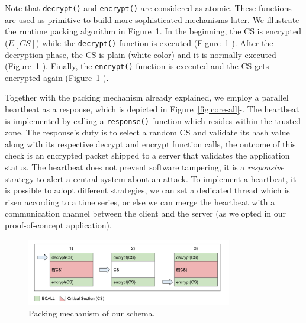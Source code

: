 Note that \texttt{decrypt()} and \texttt{encrypt()} are considered as atomic. 
These functions are used as primitive to build more sophisticated mechanisms 
later.
We illustrate the runtime packing algorithm in Figure~\ref{fig:dec1}.
In the beginning, the CS is encrypted (\ie $E[CS]$) while the 
\texttt{decrypt()} function is executed  (Figure~\ref{fig:dec1}-). 
After the decryption phase, the CS is plain (white color) and it is normally 
executed (Figure~\ref{fig:dec1}-).
Finally, the \texttt{encrypt()} function is executed and the CS gets encrypted 
again (Figure~\ref{fig:dec1}-).

Together with the packing mechanism already explained, we employ a parallel 
heartbeat as a response, which is depicted in 
Figure~\ref{fig:core-all}-.
The heartbeat is implemented by calling a \texttt{response()} function which 
resides within the trusted zone.
The response's duty is to select a random CS and validate its hash value along 
with its respective decrypt and encrypt function calls, the outcome of this 
check is an encrypted packet shipped to a server that validates the application 
status.
The heartbeat does not prevent software tampering, it is a \emph{responsive} 
strategy to alert a central system about an attack.
To implement a heartbeat, it is possible to adopt different strategies, \eg we 
can set a dedicated thread which is risen according to a time series, or else 
we can merge the heartbeat with a communication channel between the client and 
the server (as we opted in our proof-of-concept application).

\begin{figure}[t]
	\centering
	\includegraphics[width=0.8\textwidth]{fig_c3/dec1.pdf}
	\caption{Packing mechanism of our schema.}
	\label{fig:dec1}
\end{figure}


